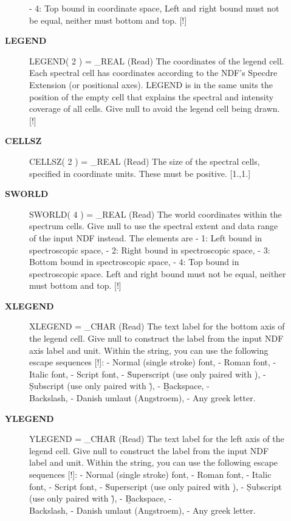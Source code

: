 \begin{description}
\begin{description}
   - 4: Top bound in coordinate space,
   Left and right bound must not be equal, neither must bottom and
   top. [!]
\item [{\bf LEGEND}]
LEGEND( 2 ) = _REAL (Read)
   The coordinates of the legend cell. Each spectral cell has
   coordinates according to the NDF's Specdre Extension (or
   positional axes). LEGEND is in the same units the position of
   the empty cell that explains the spectral and intensity
   coverage of all cells. Give null to avoid the legend cell being
   drawn. [!]
\item [{\bf CELLSZ}]
CELLSZ( 2 ) = _REAL (Read)
   The size of the spectral cells, specified in coordinate units.
   These must be positive. [1.,1.]
\item [{\bf SWORLD}]
SWORLD( 4 ) = _REAL (Read)
   The world coordinates within the spectrum cells. Give null to
   use the spectral extent and data range of the input NDF
   instead. The elements are
   - 1: Left bound in spectroscopic space,
   - 2: Right bound in spectroscopic space,
   - 3: Bottom bound in spectroscopic space,
   - 4: Top bound in spectroscopic space.
   Left and right bound must not be equal, neither must bottom and
   top. [!]
\item [{\bf XLEGEND}]
XLEGEND = _CHAR (Read)
   The text label for the bottom axis of the legend cell. Give
   null to construct the label from the input NDF axis label and
   unit. Within the string, you can use the following escape
   sequences [!]:
   - \fn Normal (single stroke) font,
   - \fr Roman font,
   - \fi Italic font,
   - \fs Script font,
   - \u  Superscript (use only paired with \d),
   - \d  Subscript (use only paired with \u),
   - \b  Backspace,
   - \\  Backslash,
   - \A  Danish umlaut (Angstroem),
   - \g  Any greek letter.
\item [{\bf YLEGEND}]
YLEGEND = _CHAR (Read)
   The text label for the left axis of the legend cell. Give null
   to construct the label from the input NDF label and
   unit. Within the string, you can use the following escape
   sequences [!]:
   - \fn Normal (single stroke) font,
   - \fr Roman font,
   - \fi Italic font,
   - \fs Script font,
   - \u  Superscript (use only paired with \d),
   - \d  Subscript (use only paired with \u),
   - \b  Backspace,
   - \\  Backslash,
   - \A  Danish umlaut (Angstroem),
   - \g  Any greek letter.

\end{description}


\end{description}
